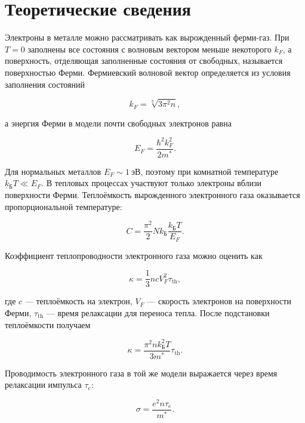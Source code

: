 \documentclass[a4paper,12pt]{article}
\begin{document}
\section{Теоретические сведения}

Электроны в металле можно рассматривать как вырожденный ферми-газ. При $T = 0$ заполнены все состояния с волновым вектором меньше некоторого $k_F$, а поверхность, отделяющая заполненные состояния от свободных, называется поверхностью Ферми. Фермиевский волновой вектор определяется из условия заполнения состояний

\begin{equation}
    k_F = \sqrt[3]{3 \pi^2 n},
\end{equation}

а энергия Ферми в модели почти свободных электронов равна

\begin{equation}
    E_F = \frac{\hbar^2 k_F^2}{2m^*}.
\end{equation}

Для нормальных металлов $E_F \sim 1~\text{эВ}$, поэтому при комнатной температуре $k_{\text{Б}}T \ll E_F$. В тепловых процессах участвуют только электроны вблизи поверхности Ферми. Теплоёмкость вырожденного электронного газа оказывается пропорциональной температуре:

\begin{equation}
    C = \frac{\pi^2}{2} N k_{\text{Б}} \frac{k_{\text{Б}}T}{E_F}.
\end{equation}

Коэффициент теплопроводности электронного газа можно оценить как

\begin{equation}
    \kappa = \frac{1}{3} n c V_F^2 \tau_{\text{th}},
\end{equation}

где $c$ --- теплоёмкость на электрон, $V_F$ --- скорость электронов на поверхности Ферми, $\tau_{\text{th}}$ --- время релаксации для переноса тепла. После подстановки теплоёмкости получаем

\begin{equation}
    \kappa = \frac{\pi^2 n k_{\text{Б}}^2 T}{3m^*}\tau_{\text{th}}.
\end{equation}

Проводимость электронного газа в той же модели выражается через время релаксации импульса $\tau_e$:

\begin{equation}
    \sigma = \frac{e^2 n \tau_e}{m^*}.
\end{equation}
\end{document}
